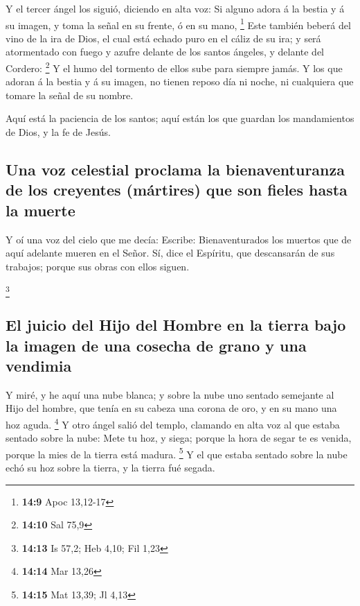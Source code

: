  Y el tercer ángel los siguió, diciendo en alta voz: Si
alguno adora á la bestia y á su imagen, y toma la señal en su frente, ó
en su mano, \footnote{\textbf{14:9} Apoc 13,12-17}  Este
también beberá del vino de la ira de Dios, el cual está echado puro en
el cáliz de su ira; y será atormentado con fuego y azufre delante de los
santos ángeles, y delante del Cordero: \footnote{\textbf{14:10} Sal 75,9}
 Y el humo del tormento de ellos sube para siempre jamás. Y
los que adoran á la bestia y á su imagen, no tienen reposo día ni noche,
ni cualquiera que tomare la señal de su nombre.

 Aquí está la paciencia de los santos; aquí están los que
guardan los mandamientos de Dios, y la fe de Jesús.

\hypertarget{una-voz-celestial-proclama-la-bienaventuranza-de-los-creyentes-muxe1rtires-que-son-fieles-hasta-la-muerte}{%
\subsection{Una voz celestial proclama la bienaventuranza de los
creyentes (mártires) que son fieles hasta la
muerte}\label{una-voz-celestial-proclama-la-bienaventuranza-de-los-creyentes-muxe1rtires-que-son-fieles-hasta-la-muerte}}

 Y oí una voz del cielo que me decía: Escribe:
Bienaventurados los muertos que de aquí adelante mueren en el Señor. Sí,
dice el Espíritu, que descansarán de sus trabajos; porque sus obras con
ellos siguen.

\footnote{\textbf{14:13} Is 57,2; Heb 4,10; Fil 1,23}

\hypertarget{el-juicio-del-hijo-del-hombre-en-la-tierra-bajo-la-imagen-de-una-cosecha-de-grano-y-una-vendimia}{%
\subsection{El juicio del Hijo del Hombre en la tierra bajo la imagen de
una cosecha de grano y una
vendimia}\label{el-juicio-del-hijo-del-hombre-en-la-tierra-bajo-la-imagen-de-una-cosecha-de-grano-y-una-vendimia}}

 Y miré, y he aquí una nube blanca; y sobre la nube uno
sentado semejante al Hijo del hombre, que tenía en su cabeza una corona
de oro, y en su mano una hoz aguda. \footnote{\textbf{14:14} Mar 13,26}
 Y otro ángel salió del templo, clamando en alta voz al que
estaba sentado sobre la nube: Mete tu hoz, y siega; porque la hora de
segar te es venida, porque la mies de la tierra está madura. \footnote{\textbf{14:15}
  Mat 13,39; Jl 4,13}  Y el que estaba sentado sobre la
nube echó su hoz sobre la tierra, y la tierra fué segada.

